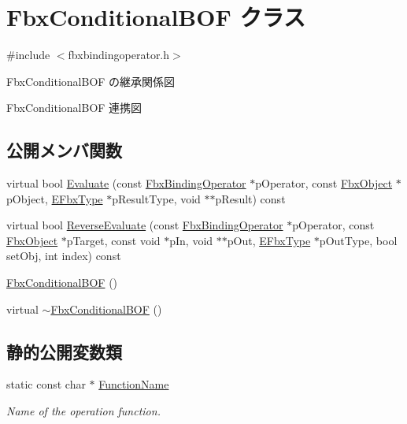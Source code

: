 \hypertarget{class_fbx_conditional_b_o_f}{}\section{Fbx\+Conditional\+B\+OF クラス}
\label{class_fbx_conditional_b_o_f}


{\ttfamily \#include $<$fbxbindingoperator.\+h$>$}



Fbx\+Conditional\+B\+OF の継承関係図


Fbx\+Conditional\+B\+OF 連携図
\subsection*{公開メンバ関数}
\begin{DoxyCompactItemize}
\item 
virtual bool \hyperlink{class_fbx_conditional_b_o_f_ac01ad643a1505219964c8b379385e931}{Evaluate} (const \hyperlink{class_fbx_binding_operator}{Fbx\+Binding\+Operator} $\ast$p\+Operator, const \hyperlink{class_fbx_object}{Fbx\+Object} $\ast$p\+Object, \hyperlink{fbxpropertytypes_8h_a73913a5ddfb20e57c6f25e9e6784bd92}{E\+Fbx\+Type} $\ast$p\+Result\+Type, void $\ast$$\ast$p\+Result) const
\item 
virtual bool \hyperlink{class_fbx_conditional_b_o_f_a2d20cc9f6b6e1c5a469c49a55c8ed512}{Reverse\+Evaluate} (const \hyperlink{class_fbx_binding_operator}{Fbx\+Binding\+Operator} $\ast$p\+Operator, const \hyperlink{class_fbx_object}{Fbx\+Object} $\ast$p\+Target, const void $\ast$p\+In, void $\ast$$\ast$p\+Out, \hyperlink{fbxpropertytypes_8h_a73913a5ddfb20e57c6f25e9e6784bd92}{E\+Fbx\+Type} $\ast$p\+Out\+Type, bool set\+Obj, int index) const
\item 
\hyperlink{class_fbx_conditional_b_o_f_ab01caa5b426f06735e3729f9c59ff58e}{Fbx\+Conditional\+B\+OF} ()
\item 
virtual \hyperlink{class_fbx_conditional_b_o_f_aa4c2e32bdf6550a9c1f36c1f0490bb3a}{$\sim$\+Fbx\+Conditional\+B\+OF} ()
\end{DoxyCompactItemize}
\subsection*{静的公開変数類}
\begin{DoxyCompactItemize}
\item 
static const char $\ast$ \hyperlink{class_fbx_conditional_b_o_f_ac0653f2120f3d07ea7c308611b9f2bbc}{Function\+Name}
\begin{DoxyCompactList}\small\item\em Name of the operation function. \end{DoxyCompactList}\end{DoxyCompactItemize}


